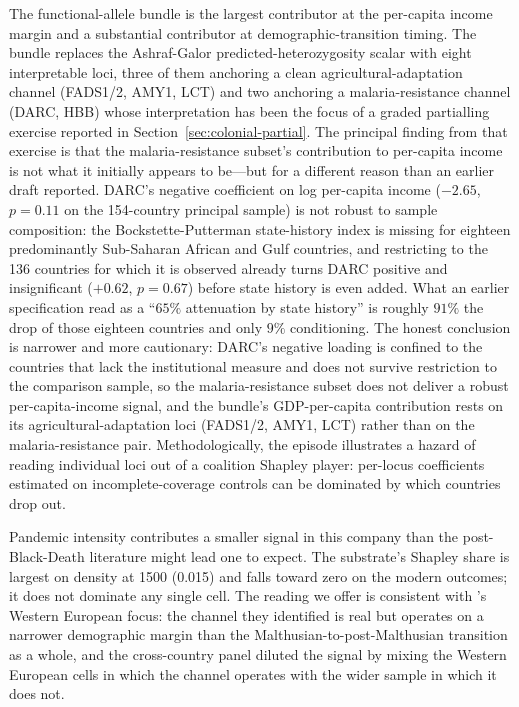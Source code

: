 \documentclass[11pt,letterpaper]{article}
\begin{document}
The functional-allele bundle is the largest contributor at the per-capita income margin and a substantial contributor at demographic-transition timing. The bundle replaces the Ashraf-Galor predicted-heterozygosity scalar with eight interpretable loci, three of them anchoring a clean agricultural-adaptation channel (FADS1/2, AMY1, LCT) and two anchoring a malaria-resistance channel (DARC, HBB) whose interpretation has been the focus of a graded partialling exercise reported in Section~\ref{sec:colonial-partial}. The principal finding from that exercise is that the malaria-resistance subset's contribution to per-capita income is not what it initially appears to be---but for a different reason than an earlier draft reported. DARC's negative coefficient on log per-capita income ($-2.65$, $p=0.11$ on the 154-country principal sample) is not robust to sample composition: the Bockstette-Putterman state-history index is missing for eighteen predominantly Sub-Saharan African and Gulf countries, and restricting to the 136 countries for which it is observed already turns DARC positive and insignificant ($+0.62$, $p=0.67$) before state history is even added. What an earlier specification read as a ``$65\%$ attenuation by state history'' is roughly $91\%$ the drop of those eighteen countries and only $9\%$ conditioning. The honest conclusion is narrower and more cautionary: DARC's negative loading is confined to the countries that lack the institutional measure and does not survive restriction to the comparison sample, so the malaria-resistance subset does not deliver a robust per-capita-income signal, and the bundle's GDP-per-capita contribution rests on its agricultural-adaptation loci (FADS1/2, AMY1, LCT) rather than on the malaria-resistance pair. Methodologically, the episode illustrates a hazard of reading individual loci out of a coalition Shapley player: per-locus coefficients estimated on incomplete-coverage controls can be dominated by which countries drop out.

Pandemic intensity contributes a smaller signal in this company than the post-Black-Death literature might lead one to expect. The substrate's Shapley share is largest on density at 1500 (0.015) and falls toward zero on the modern outcomes; it does not dominate any single cell. The reading we offer is consistent with \citet{voigtlander2013how}'s Western European focus: the channel they identified is real but operates on a narrower demographic margin than the Malthusian-to-post-Malthusian transition as a whole, and the cross-country panel diluted the signal by mixing the Western European cells in which the channel operates with the wider sample in which it does not.
\end{document}
